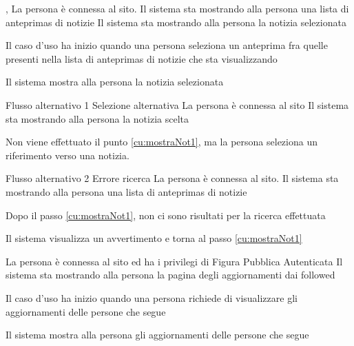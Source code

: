 {, }
{La persona è connessa al sito. Il sistema sta mostrando alla persona una lista di \glspl{anteprima} di notizie}
{Il sistema sta mostrando alla persona la notizia selezionata}
{\begin{enumCU}
	\item Il caso d'uso ha inizio quando una persona seleziona un \gls{anteprima} fra quelle presenti nella lista di \glspl{anteprima} di notizie che sta visualizzando\label{cu:mostraNot1}
	\item Il sistema mostra alla persona la notizia selezionata
	\item {}
\end{enumCU}
}
%
{Flusso alternativo 1}%
{Selezione alternativa}%
{La persona è connessa al sito}%
{Il sistema sta mostrando alla persona la notizia scelta}%
{\begin{enumCU}
		\item Non viene effettuato il punto \ref{cu:mostraNot1}, ma la persona seleziona un \gls{riferimento} verso una notizia.
\end{enumCU}}%
%
{Flusso alternativo 2}%
{Errore ricerca}%
{La persona è connessa al sito. Il sistema sta mostrando alla persona una lista di \glspl{anteprima} di notizie}%
{\postNulle}%
{\begin{enumCU}
		\item Dopo il passo \ref{cu:mostraNot1}, non ci sono risultati per la ricerca effettuata
		\item Il sistema visualizza un avvertimento e torna al passo \ref{cu:mostraNot1}
\end{enumCU}}%


{}
{La persona è connessa al sito ed ha i privilegi di Figura Pubblica Autenticata}
{Il sistema sta mostrando alla persona la pagina degli aggiornamenti dai followed}
{\begin{enumCU}
	\item Il caso d'uso ha inizio quando una persona richiede di visualizzare gli aggiornamenti delle persone che segue
	\item Il sistema mostra alla persona gli aggiornamenti delle persone che segue
\end{enumCU}}

